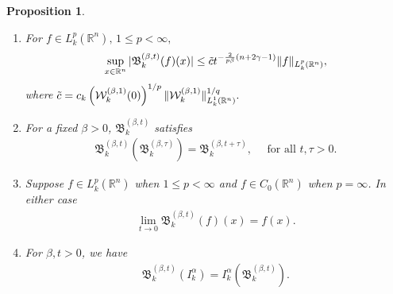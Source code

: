 \documentclass[11pt,a4paper,reqno]{amsproc}
\newtheorem{proposition}[theorem]{Proposition}
\theoremstyle{definition}
\theoremstyle{remark}
\numberwithin{equation}{section}
\begin{document}
\begin{proposition}
\begin{enumerate}[$(i)$]
\begin{align}
          \end{align}
           where $\mathcal{M}_k(f)$ is the maximal function associated with Dunkl transform.\\ 
          \item  For $ f \in L_k^p(\mathbb{R}^n),\, 1\le p < \infty, $ 
          \begin{align*}
              \sup_{x\in \mathbb{R}^n}|\mathfrak{B}_k^{(\beta,t)}(f)(x)|\le \Tilde{c}t^{-\frac{2}{p\beta}(n+2\gamma-1)}\|f\|_{L_k^p(\mathbb{R}^n)}, 
          \end{align*} where $\Tilde{c}=c_k \left( \mathcal{W}_k^{(\beta,1)}(0)\right)^{1/p} \|\mathcal{W}_k^{(\beta,1)}\|_{L_k^1(\mathbb{R}^n)}^{1/q}.$
          \item For a fixed $\beta >0$, $\mathfrak{B}_k^{(\beta,t)}$ satisfies
          \begin{align} \label{beta-additivity}
              \mathfrak{B}_k^{(\beta,t)}(\mathfrak{B}_k^{(\beta,\tau)})=\mathfrak{B}_k^{(\beta,t+\tau)},\quad \text{  for all $t, \tau >0.$}
          \end{align}
          \item Suppose $f \in L_k^p(\mathbb{R}^n)$ when $1\le p < \infty$ and  $f \in C_0(\mathbb{R}^n)$ when $ p=\infty$. In either case 
          \begin{align*}
              \lim_{t\rightarrow 0} \mathfrak{B}_k^{(\beta,t)}(f) (x)= f(x) . 
          \end{align*}
         \item For $\beta, t >0$, we have
         \begin{align} \label{Prop-Main-xi}
\mathfrak{B}_k^{(\beta,t)}\left(I_k^\alpha\right)=I_k^\alpha\left(\mathfrak{B}_k^{(\beta,t)}\right).
         \end{align}
      \end{enumerate}
\end{proposition}
\end{document}
